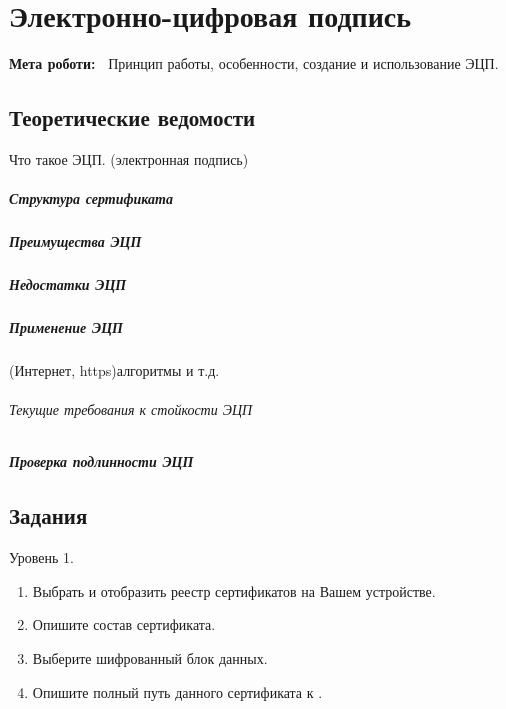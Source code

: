 \chapter{Электронно-цифровая подпись} \label{chapt4}%
\textbf{Мета роботи:~}%
Принцип работы, особенности, создание и использование ЭЦП.
\section{Теоретические ведомости} \label{sect4_a}


Что такое ЭЦП. (электронная подпись)

\paragraph{Структура сертификата}
\paragraph{Преимущества ЭЦП}

\paragraph{Недостатки ЭЦП}

\paragraph{Применение ЭЦП}
(Интернет, https)алгоритмы и т.д.

\subparagraph{Текущие требования к стойкости ЭЦП}

\paragraph{Проверка подлинности ЭЦП}
\section{Задания}\label{sect4_b}

Уровень 1. %

\begin{enumerate}
  \item Выбрать и отобразить реестр сертификатов на Вашем устройстве.
  \item Опишите состав сертификата.
  \item Выберите шифрованный блок данных.
  \item Опишите полный путь данного сертификата к .
\end{enumerate}

